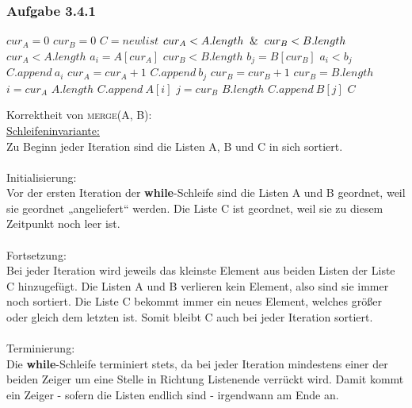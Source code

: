 \documentclass{article}
\begin{document}
\subsubsection{Aufgabe 3.4.1}
    \begin{codebox}
        \li $cur_A = 0$
		\li $cur_B = 0$
		\li $C = newlist$
		\li \While $cur_A < A.length \And cur_B < B.length$
		\Indentmore
		    \li \If $cur_A < A.length$
		    \Indentmore
	    		\li $a_i = A[cur_A]$
	    		\End
	    	\li \If $cur_B < B.length$
	    	\Indentmore
    			\li $b_j = B[cur_B]$
    			\End
			\li \If $a_i < b_j$
			\Indentmore
			    \li $C.append~a_i$
			    \li $cur_A = cur_A + 1$
			    \li \Else
			    \li $C.append~b_j$
			    \li $cur_B = cur_B + 1$
			    \End
			\End
		\li \If $cur_B = B.length$
		\Indentmore
		    \li \For $i = cur_A$ \To $A.length$
		    \Indentmore
		        \li $C.append~A[i]$
		        \End
		    \li \Else %
    		\li \For $j = cur_B$ \To $B.length$
    		\Indentmore
    		    \li $C.append~B[j]$
    		    \End
    		\End
    	\li \Return $C$
	\end{codebox}
	Korrektheit von \textsc{merge(A, B)}:\\
    \underline{Schleifeninvariante:}\\
    Zu Beginn jeder Iteration sind die Listen A, B und C in sich sortiert.\\
    \\
    Initialisierung:\\
    Vor der ersten Iteration der \textbf{while}-Schleife sind die Listen A und B geordnet, weil sie geordnet „angeliefert“ werden. Die Liste C ist geordnet, weil sie zu diesem Zeitpunkt noch leer ist.\\
    \\
    Fortsetzung:\\
    Bei jeder Iteration wird jeweils das kleinste Element aus beiden Listen der Liste C hinzugefügt.
    Die Listen A und B verlieren kein Element, also sind sie immer noch sortiert.
    Die Liste C bekommt immer ein neues Element, welches größer oder gleich dem letzten ist. Somit bleibt C auch bei jeder Iteration sortiert.\\
    \\
    Terminierung:\\
    Die \textbf{while}-Schleife terminiert stets, da bei jeder Iteration mindestens einer der beiden Zeiger um eine Stelle in Richtung Listenende verrückt wird.
    Damit kommt ein Zeiger - sofern die Listen endlich sind - irgendwann am Ende an.\\
\end{document}
